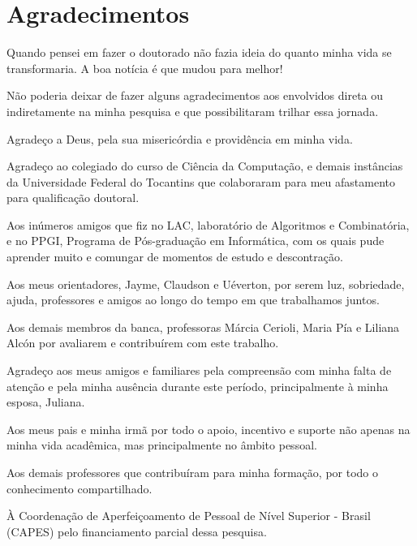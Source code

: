 \chapter*{Agradecimentos}

Quando pensei em fazer o doutorado não fazia ideia do quanto minha vida se transformaria. A boa notícia é que mudou para melhor!

Não poderia deixar de fazer alguns agradecimentos aos envolvidos direta ou indiretamente na minha pesquisa e que possibilitaram trilhar essa jornada. 

Agradeço a Deus, pela sua misericórdia e providência em minha vida.

Agradeço ao colegiado do curso de Ciência da Computação, e demais instâncias da Universidade Federal do Tocantins que colaboraram para meu afastamento para qualificação doutoral.

Aos inúmeros amigos que fiz no LAC, laboratório de Algoritmos e Combinatória, e no PPGI, Programa de Pós-graduação em Informática, com os quais pude aprender muito e comungar de momentos de estudo e descontração.

Aos meus orientadores, Jayme, Claudson e Uéverton, por serem luz, sobriedade, ajuda, professores e amigos ao longo do tempo em que trabalhamos juntos.

Aos demais membros da banca, professoras Márcia Cerioli, Maria Pía e Liliana Alcón por avaliarem e contribuírem com este trabalho.


Agradeço aos meus amigos e familiares pela compreensão com minha falta de atenção e pela minha ausência durante este período, principalmente à minha esposa, Juliana.


Aos meus pais e minha irmã por todo o apoio, incentivo e suporte não apenas na minha vida acadêmica, mas principalmente no âmbito pessoal.

Aos demais professores que contribuíram para minha formação, por todo o conhecimento compartilhado.

À Coordenação de Aperfeiçoamento 
de Pessoal de Nível Superior - Brasil (CAPES) pelo financiamento parcial dessa pesquisa.